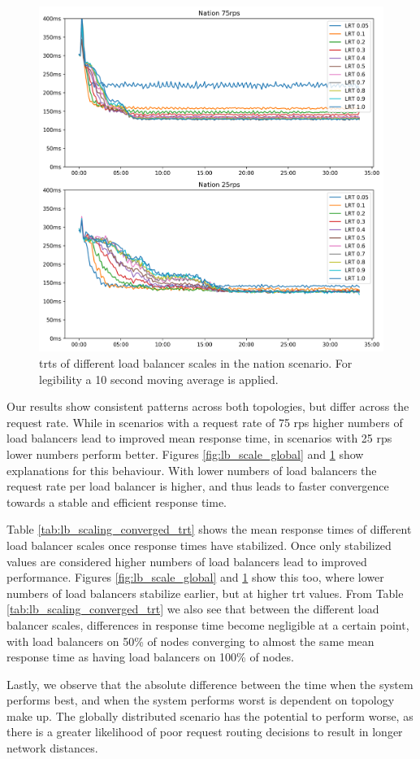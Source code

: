 \begin{figure}
    \centering
    \includegraphics[width=\linewidth]{graphics/graphs/nation_lb_scale.png}
    \caption{\glspl{trt} of different load balancer scales in the nation scenario. For legibility a 10 second moving average is applied.}
    \label{fig:lb_scale_nation}
\end{figure}

Our results show consistent patterns across both topologies, but differ across the request rate.
While in scenarios with a request rate of 75 \gls{rps} higher numbers of load balancers lead to improved mean response time, in scenarios with 25 \gls{rps} lower numbers perform better.
Figures \ref{fig:lb_scale_global} and \ref{fig:lb_scale_nation} show explanations for this behaviour.
With lower numbers of load balancers the request rate per load balancer is higher, and thus leads to faster convergence towards a stable and efficient response time.

Table \ref{tab:lb_scaling_converged_trt} shows the mean response times of different load balancer scales once response times have stabilized.
Once only stabilized values are considered higher numbers of load balancers lead to improved performance.
Figures \ref{fig:lb_scale_global} and \ref{fig:lb_scale_nation} show this too, where lower numbers of load balancers stabilize earlier, but at higher \gls{trt} values.
From Table \ref{tab:lb_scaling_converged_trt} we also see that between the different load balancer scales, differences in response time become negligible at a certain point, with load balancers on 50\% of nodes converging to almost the same mean response time as having load balancers on 100\% of nodes.

Lastly, we observe that the absolute difference between the time when the system performs best, and when the system performs worst is dependent on topology make up.
The globally distributed scenario has the potential to perform worse, as there is a greater likelihood of poor request routing decisions to result in longer network distances.
